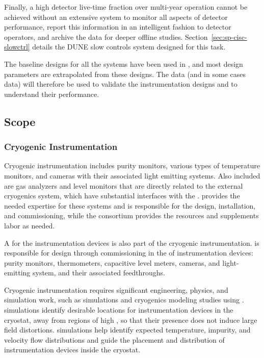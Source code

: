 Finally, a high detector live-time fraction over multi-year operation cannot be achieved without an extensive system to monitor all aspects of detector performance, report this information in an intelligent fashion to detector operators, and archive the data for deeper offline studies.  Section~\ref{sec:sp-cisc-slowctrl} details the DUNE slow controls system designed for this task.
 
The baseline designs for all the  systems have been used in , %
and most design
parameters are extrapolated from these designs. The  data (and in some cases  data) will therefore be used to validate the instrumentation designs and to understand their performance.

\subsection{Scope}

\subsubsection{Cryogenic Instrumentation}
Cryogenic instrumentation includes purity monitors,  various types of temperature monitors, and cameras with their associated light emitting systems. Also included are %
gas analyzers and  level monitors that are directly related to the external cryogenics system, which have substantial interfaces with the .  provides the needed expertise  for these systems and is responsible for the design, installation, and commissioning, while the  consortium provides the resources and supplements labor as needed. 

A  for the instrumentation devices is also part of the cryogenic instrumentation.
  is responsible for design through commissioning in the  %
of  instrumentation devices: purity monitors, thermometers, capacitive level meters, cameras, and light-emitting system, and their associated feedthroughs.

Cryogenic instrumentation %
requires significant engineering, physics, and
simulation work, such as \efield simulations and cryogenics modeling
studies using . \efield simulations
identify desirable locations for instrumentation
devices in the cryostat, away from %
regions of high \efield, so that %
their presence does not induce large field distortions. 
 simulations help identify %
expected temperature, impurity, and velocity flow distributions and guide the placement and distribution of instrumentation devices inside the cryostat.

